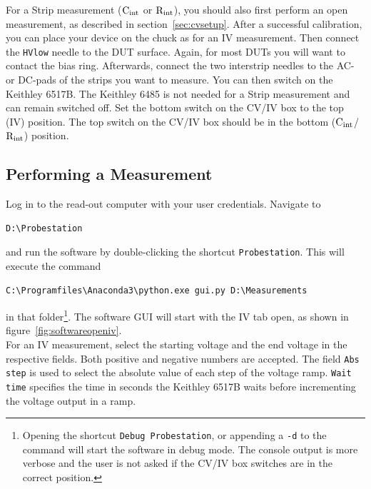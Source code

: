 \documentclass[a4paper]{article}
\begin{document}
For a Strip measurement (${\rm C_{int}}$ or ${\rm R_{int}}$), you should also first perform an open measurement, as described in section~\ref{sec:cvsetup}.
After a successful calibration, you can place your device on the chuck as for an IV measurement.
Then connect the {\tt HVlow} needle to the DUT surface.
Again, for most DUTs you will want to contact the bias ring.
Afterwards, connect the two interstrip needles to the AC- or DC-pads of the strips you want to measure.
You can then switch on the Keithley 6517B.
The Keithley 6485 is not needed for a Strip measurement and can remain switched off.
Set the bottom switch on the CV/IV box to the top (IV) position.
The top switch on the CV/IV box should be in the bottom (${\rm C_{int}}$/${\rm R_{int}}$) position.\\

\subsection{Performing a Measurement}
\label{sec:ivmeas}

Log in to the read-out computer with your user credentials.
Navigate to

\medskip
\begin{lstlisting}
D:\Probestation
\end{lstlisting}
\medskip

and run the software by double-clicking the shortcut {\tt Probestation}.
This will execute the command

\medskip
\begin{lstlisting}
C:\Programfiles\Anaconda3\python.exe gui.py D:\Measurements
\end{lstlisting}
\medskip

in that folder\footnote{Opening the shortcut {\tt Debug Probestation}, or appending a {\tt -d} to the command will start the software in debug mode. The console output is more verbose and the user is not asked if the CV/IV box switches are in the correct position.}.
The software GUI will start with the IV tab open, as shown in figure~\ref{fig:softwareopeniv}.\\

For an IV measurement, select the starting voltage and the end voltage in the respective fields.
Both positive and negative numbers are accepted.
The field {\tt Abs step} is used to select the absolute value of each step of the voltage ramp.
{\tt Wait time} specifies the time in seconds the Keithley 6517B waits before incrementing the voltage output in a ramp.\\
\end{document}
